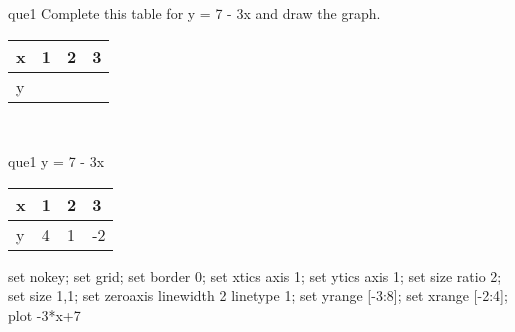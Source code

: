 \documentclass[13.5pt, varwidth=true]{beamer}
\begin{document}
\begin{frame}[shrink=19,fragile]
	\begin{beamercolorbox}[rounded=true, left, shadow=true,wd=14.8cm]{que1}
		 Complete this table for y = 7 - 3x and draw the graph. \\[0.3cm] \renewcommand{\arraystretch}{1.2}\begin{tabular}{|C|C|C|C|} \hline x & 1 & 2 & 3 \\ \hline y & & & \\ \hline \end{tabular}\\[0.3cm]
	\end{beamercolorbox}
\end{frame}
\begin{frame}[shrink=19,fragile]
	\begin{beamercolorbox}[rounded=true, left, shadow=true,wd=14.8cm]{que1}
		y = 7 - 3x\renewcommand{\arraystretch}{1.2}\begin{tabular}{|C|C|C|C|} \hline x & 1 & 2 & 3 \\ \hline y & 4 & 1 & -2\\ \hline \end{tabular}\begin{gnuplot}[terminal=pdf] set nokey; set grid; set border 0; set xtics axis 1; set ytics axis 1; set size ratio 2; set size 1,1; set zeroaxis linewidth 2 linetype 1; set yrange [-3:8]; set xrange [-2:4]; plot -3*x+7 \end{gnuplot}
	\end{beamercolorbox}
\end{frame}
\end{document}

